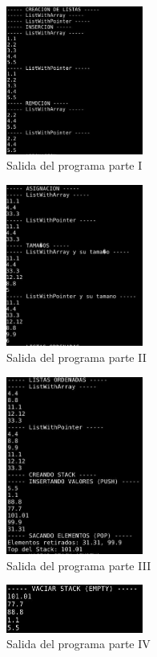 \documentclass[11pt]{article}
\begin{document}
\begin{figure}[H]
\centering
\includegraphics[width=0.4\textwidth]{img/salida01.JPG}
\caption{Salida del programa parte I}
\label{fig:Figura1}
\end{figure}

\begin{figure}[H]
\centering
\includegraphics[width=0.4\textwidth]{img/salida02.JPG}
\caption{Salida del programa parte II}
\label{fig:Figura2}
\end{figure}

\begin{figure}[H]
\centering
\includegraphics[width=0.4\textwidth]{img/salida03.JPG}
\caption{Salida del programa parte III}
\label{fig:Figura3}
\end{figure}

\begin{figure}[H]
\centering
\includegraphics[width=0.4\textwidth]{img/salida04.JPG}
\caption{Salida del programa parte IV}
\label{fig:Figura4}
\end{figure}
\newpage
\nocite{*}


\end{document}
